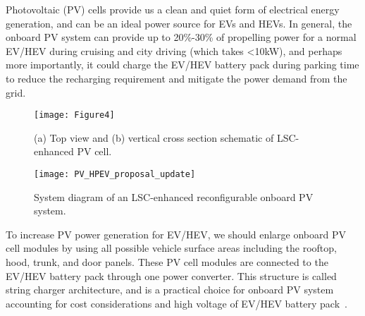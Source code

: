
\setcounter{section}{0}
\setcounter{figure}{0}
\graphicspath{{./figs/}{./figs/item-yanzhi/}}


Photovoltaic (PV) cells provide us a clean and quiet form of electrical energy generation, and can be an ideal power source for EVs and HEVs. In general, the onboard PV system can provide up to 20\%-30\% of propelling power for a normal EV/HEV during cruising and city driving (which takes <10kW), and perhaps more importantly, it could charge the EV/HEV battery pack during parking time to reduce the recharging requirement and mitigate the power demand from the grid.

\begin{figure}[h]
    \centering
    \texttt{[image: Figure4]}
    \caption{(a) Top view and (b) vertical cross section schematic of LSC-enhanced PV cell.}
    \label{fig:1}
\end{figure}




\begin{figure}[h]
    \centering
    \texttt{[image: PV\_HPEV\_proposal\_update]}
    \caption{System diagram of an LSC-enhanced reconfigurable onboard PV
system.}
    \label{fig:2}
\end{figure}



To increase PV power generation for EV/HEV, we should enlarge onboard PV cell modules by using all possible vehicle surface areas including the rooftop, hood, trunk, and door panels. These PV cell modules are connected to the EV/HEV battery pack through one power converter. This structure is called string charger architecture, and is a practical choice for onboard PV system accounting for cost considerations and high voltage of EV/HEV battery pack~\cite{xiao2007topology,hamilton2010system}.

